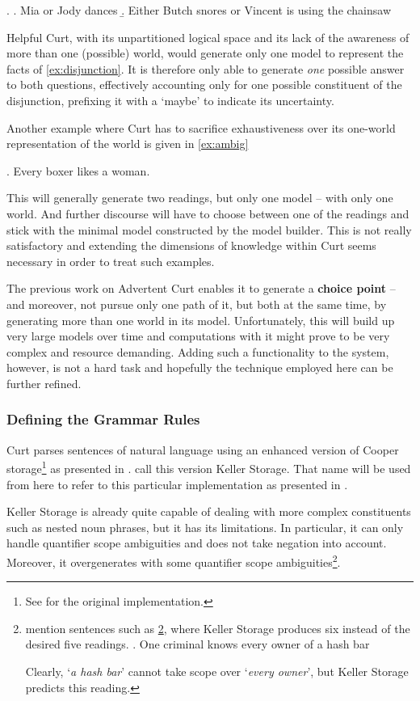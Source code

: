 \documentclass[a4paper]{article}
\newcommand{\term}[1]{\textsf{\textbf{#1}}} %
\newcommand{\pn}{\textsf} %
\newcommand{\example}[1]{`\textit{#1}'} %
\newcommand{\curt}{\pn{Curt}}
\newcommand{\acurt}{\pn{Advertent Curt}}
\theoremstyle{remark}
\theoremstyle{remark}
\theoremstyle{definition}
\theoremstyle{definition}
\begin{document}
\ex. \label{ex:disjunction} \a. Mia or Jody dances
\b. Either Butch snores or Vincent is using the chainsaw

\pn{Helpful Curt}, with its unpartitioned logical space and its lack of
the awareness of more than one (possible) world, would generate only one model
to represent the facts of \ref{ex:disjunction}. It is therefore only able to
generate \emph{one} possible answer to both questions, effectively accounting only
for one possible constituent of the disjunction, prefixing it with a `maybe' to
indicate its uncertainty.

Another example where \curt{} has to sacrifice exhaustiveness over its one-world
representation of the world is given in \ref{ex:ambig}

\ex.\label{ex:ambig} Every boxer likes a woman.

This will generally generate two readings, but only one model -- with only one
world. And further discourse will have to choose between one of the readings and
stick with the minimal model constructed by the model builder. This is not
really satisfactory and extending the dimensions of knowledge within \curt{} seems
necessary in order to treat such examples.

The previous work on \acurt{} enables it to generate a \term{choice point} -- and
moreover, not pursue only one path of it, but both at the same time, by
generating more than one world in its model.
Unfortunately, this will build up very large models over time and computations
with it might prove to be very complex and resource demanding. Adding such a
functionality to the system, however, is not a hard task and hopefully the
technique employed here can be further refined. %

\subsubsection{Defining the Grammar Rules}

\curt{} parses sentences of natural language using an enhanced version of \pn{Cooper
storage}\footnote{See \cite{cooper:storage2} for the original implementation.} as
presented in \cite{keller:storage}. \cite{blackburnbos:cl1} call this version
\pn{Keller Storage}. That name will be used from here %
to refer to this particular implementation as presented in
\cite{blackburnbos:cl1}. 

\pn{Keller Storage} is already quite capable
of dealing with more complex constituents such as nested noun phrases, but it
has its limitations. In particular, it can only handle quantifier scope
ambiguities and does not take negation into account. Moreover, it overgenerates
with some quantifier scope ambiguities\footnote{\cite{blackburnbos:cl1} mention
sentences such as \ref{ex:kellersucks}, where Keller Storage produces six
instead of the desired five readings.
\ex. One criminal knows every owner of a hash bar\label{ex:kellersucks}

Clearly, \example{a hash bar} cannot take scope over \example{every owner}, but
Keller Storage predicts this reading.}.
\end{document}
